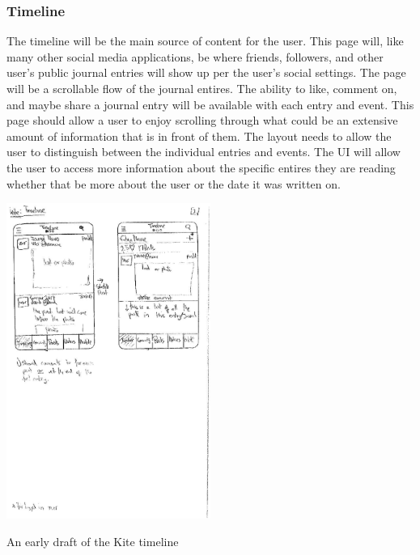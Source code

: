 \documentclass[compsoc, 10, draftclsnofoot, onecolumn]{IEEEtran}
\begin{document}
\subsubsection{Timeline}
The timeline will be the main source of content for the user. This page will, like many other social media applications, be where friends, followers, and other user's public journal entries will show up per the user's social settings. The page will be a scrollable flow of the journal entires. The ability to like, comment on, and maybe share a journal entry will be available with each entry and event. This page should allow a user to enjoy scrolling through what could be an extensive amount of information that is in front of them. The layout needs to allow the user to distinguish between the individual entries and events. The UI will allow the user to access more information about the specific entires they are reading whether that be more about the user or the date it was written on.
\begin{center}
\includegraphics[width=0.5\textwidth]{Timeline2}

An early draft of the Kite timeline
\end{center}
\end{document}
